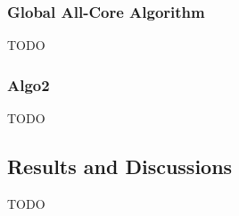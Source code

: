 \documentclass{llncs}
\begin{document}
\subsubsection{Global All-Core Algorithm}
TODO
\subsubsection{Algo2}
TODO
\subsection{Results and Discussions}\label{subsec-result2}
TODO







\end{document}

